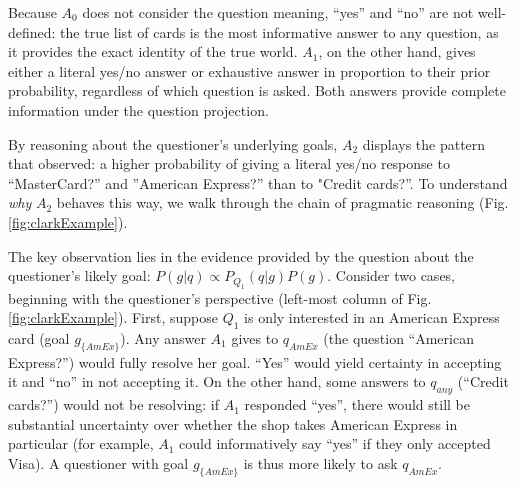 \documentclass[11pt, floatsintext]{apa6}
\begin{document}
Because $A_0$ does not consider the question meaning, ``yes'' and ``no'' are not well-defined: the true list of cards is the most informative answer to any question, as it provides the exact identity of the true world. $A_1$, on the other hand, gives either a literal yes/no answer or exhaustive answer in proportion to their prior probability, regardless of which question is asked. Both answers provide complete information under the question projection.

By reasoning about the questioner's underlying goals, $A_2$ displays the pattern that  observed: a higher probability of giving a literal yes/no response to ``MasterCard?'' and ''American Express?'' than to "Credit cards?''. To understand \emph{why} $A_2$ behaves this way, we walk through the chain of pragmatic reasoning (Fig. \ref{fig:clarkExample}).

The key observation lies in the evidence provided by the question about the questioner's likely goal: $P(g | q) \propto P_{Q_1}(q|g)P(g)$. Consider two cases, beginning with the questioner's perspective  (left-most column of Fig. \ref{fig:clarkExample}). First, suppose $Q_1$ is only interested in an American Express card (goal $g_{\{AmEx\}}$). Any answer $A_1$ gives to $q_{AmEx}$ (the question ``American Express?'') would fully resolve her goal. ``Yes'' would yield certainty in accepting it and ``no'' in not accepting it. On the other hand, some answers to $q_{any}$ (``Credit cards?'') would not be resolving: if $A_1$ responded ``yes'', there would still be substantial uncertainty over whether the shop takes American Express in particular (for example, $A_1$ could informatively say ``yes'' if they only accepted Visa). A questioner with goal $g_{\{AmEx\}}$  is thus more likely to ask $q_{AmEx}$.


\end{document}
